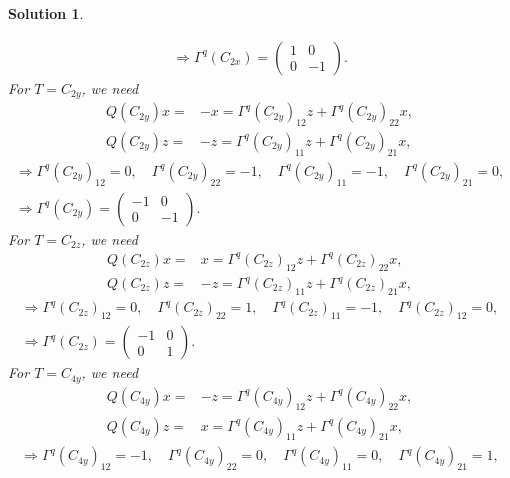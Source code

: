 \documentclass[UTF8,10pt,a4paper]{article}
\theoremstyle{Problem}
\theoremstyle{Solution}
\newtheorem*{sol}{Solution}
\begin{document}
\begin{sol}
\begin{enumerate}
\begin{gather}
            \Longrightarrow\Gamma^q(C_{2x})=\left(\begin{matrix}
                1&0\\
                0&-1
            \end{matrix}\right).
        \end{gather}
        For $T=C_{2y}$, we need
        \begin{align}
            Q(C_{2y})x=&-x=\Gamma^q(C_{2y})_{12}z+\Gamma^q(C_{2y})_{22}x,\\
            Q(C_{2y})z=&-z=\Gamma^q(C_{2y})_{11}z+\Gamma^q(C_{2y})_{21}x,
        \end{align}
        \begin{gather}
            \Longrightarrow\Gamma^q(C_{2y})_{12}=0,\quad\Gamma^q(C_{2y})_{22}=-1,\quad\Gamma^q(C_{2y})_{11}=-1,\quad\Gamma^q(C_{2y})_{21}=0,\\
            \Longrightarrow\Gamma^q(C_{2y})=\left(\begin{matrix}
                -1&0\\
                0&-1
            \end{matrix}\right).
        \end{gather}
        For $T=C_{2z}$, we need
        \begin{align}
            Q(C_{2z})x=&x=\Gamma^q(C_{2z})_{12}z+\Gamma^q(C_{2z})_{22}x,\\
            Q(C_{2z})z=&-z=\Gamma^q(C_{2z})_{11}z+\Gamma^q(C_{2z})_{21}x,
        \end{align}
        \begin{gather}
            \Longrightarrow\Gamma^q(C_{2z})_{12}=0,\quad\Gamma^q(C_{2z})_{22}=1,\quad\Gamma^q(C_{2z})_{11}=-1,\quad\Gamma^q(C_{2z})_{12}=0,\\
            \Longrightarrow\Gamma^q(C_{2z})=\left(\begin{matrix}
                -1&0\\
                0&1
            \end{matrix}\right).
        \end{gather}
        For $T=C_{4y}$, we need
        \begin{align}
            Q(C_{4y})x=&-z=\Gamma^q(C_{4y})_{12}z+\Gamma^q(C_{4y})_{22}x,\\
            Q(C_{4y})z=&x=\Gamma^q(C_{4y})_{11}z+\Gamma^q(C_{4y})_{21}x,
        \end{align}
        \begin{gather}
            \Longrightarrow\Gamma^q(C_{4y})_{12}=-1,\quad\Gamma^q(C_{4y})_{22}=0,\quad\Gamma^q(C_{4y})_{11}=0,\quad\Gamma^q(C_{4y})_{21}=1,\\

\end{gather}
\end{enumerate}
\end{sol}
\end{document}
